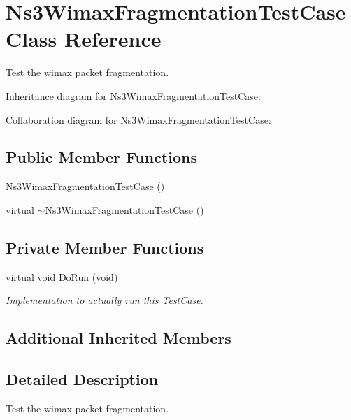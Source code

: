 \hypertarget{classNs3WimaxFragmentationTestCase}{}\section{Ns3\+Wimax\+Fragmentation\+Test\+Case Class Reference}
\label{classNs3WimaxFragmentationTestCase}


Test the wimax packet fragmentation.  




Inheritance diagram for Ns3\+Wimax\+Fragmentation\+Test\+Case\+:


Collaboration diagram for Ns3\+Wimax\+Fragmentation\+Test\+Case\+:
\subsection*{Public Member Functions}
\begin{DoxyCompactItemize}
\item 
\hyperlink{classNs3WimaxFragmentationTestCase_a101615ede7f90f86c8ee5b469b0a2883}{Ns3\+Wimax\+Fragmentation\+Test\+Case} ()
\item 
virtual \hyperlink{classNs3WimaxFragmentationTestCase_a8985d99e17ab81053c37b85348b1bb2a}{$\sim$\+Ns3\+Wimax\+Fragmentation\+Test\+Case} ()
\end{DoxyCompactItemize}
\subsection*{Private Member Functions}
\begin{DoxyCompactItemize}
\item 
virtual void \hyperlink{classNs3WimaxFragmentationTestCase_ac4725340138d07d67dbb72aaa5ccd84b}{Do\+Run} (void)
\begin{DoxyCompactList}\small\item\em Implementation to actually run this Test\+Case. \end{DoxyCompactList}\end{DoxyCompactItemize}
\subsection*{Additional Inherited Members}


\subsection{Detailed Description}
Test the wimax packet fragmentation. 

